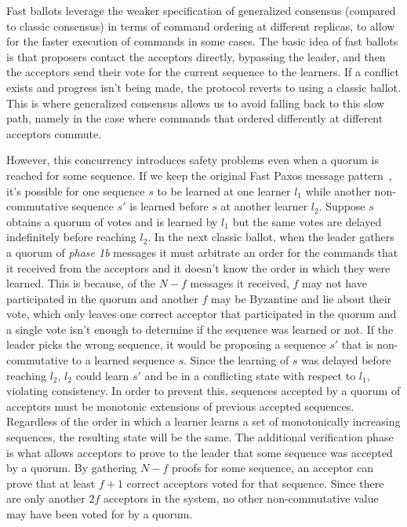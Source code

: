 Fast ballots leverage the weaker specification of generalized consensus (compared to classic consensus) in terms of command ordering at different replicas, to allow for the faster execution of commands in some cases. The basic idea of fast ballots is that proposers contact the acceptors directly, bypassing the leader, and then the acceptors send their vote for the current sequence to the learners. If a conflict exists and progress isn't being made, the protocol reverts to using a classic ballot. This is where generalized consensus allows us to avoid falling back to this slow path, namely in the case where commands that ordered differently at different acceptors commute. \par 
However, this concurrency introduces safety problems even when a quorum is reached for some sequence. If we keep the original Fast Paxos message pattern~\cite{L06}, it's possible for one sequence $s$ to be learned at one learner $l_1$ while another non-commutative sequence $s'$ is learned before $s$ at another learner $l_2$. Suppose $s$ obtains a quorum of votes and is learned by $l_1$ but the same votes are delayed indefinitely before reaching $l_2$. In the next classic ballot, when the leader gathers a quorum of \textit{phase 1b} messages it must arbitrate an order for the commands that it received from the acceptors and it doesn't know the order in which they were learned. This is because, of the $N-f$ messages it received, $f$ may not have participated in the quorum and another $f$ may be Byzantine and lie about their vote, which only leaves one correct acceptor that participated in the quorum and a single vote isn't enough to determine if the sequence was learned or not. If the leader picks the wrong sequence, it would be proposing a sequence $s'$ that is non-commutative to a learned sequence $s$. Since the learning of $s$ was delayed before reaching $l_2$, $l_2$ could learn $s'$ and be in a conflicting state with respect to $l_1$, violating consistency. In order to prevent this, sequences accepted by a quorum of acceptors must be monotonic extensions of previous accepted sequences. Regardless of the order in which a learner learns a set of monotonically increasing sequences, the resulting state will be the same. The additional verification phase is what allows acceptors to prove to the leader that some sequence was accepted by a quorum. By gathering $N-f$ proofs for some sequence, an acceptor can prove that at least $f+1$ correct acceptors voted for that sequence. Since there are only another $2f$ acceptors in the system, no other non-commutative value may have been voted for by a quorum. \par
